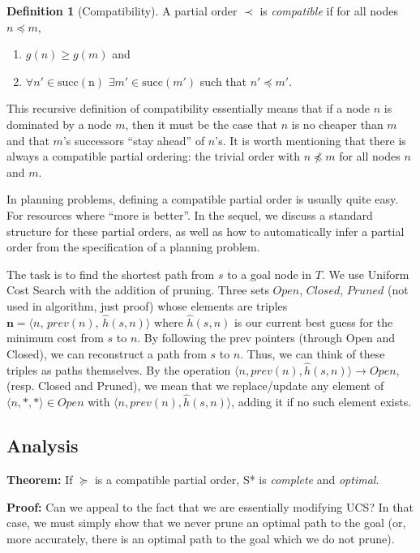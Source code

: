 \documentclass[letterpaper]{article}
\theoremstyle{plain} \newtheorem{theorem}{Theorem} \newtheorem{proposition}{Proposition} \newtheorem{lemma}{Lemma} \newtheorem*{corollary}{Corollary}
\theoremstyle{definition} \newtheorem{definition}{Definition} \newtheorem{conjecture}{Conjecture} \newtheorem*{example}{Example}
\theoremstyle{remark} \newtheorem*{remark}{Remark} \newtheorem*{note}{Note} \newtheorem{case}{Case}
\begin{document}
\begin{definition}[Compatibility]
  A partial order $\prec$ is \textit{compatible} if for all nodes $n \preceq m$,
  \begin{enumerate}
    \item $g(n) \ge g(m)$ and 
    \item $\forall n' \in \mathrm{succ(n)}$ $\exists m' \in \mathrm{succ}(m')$ such that $n' \preceq m'$.
  \end{enumerate}
\end{definition}
This recursive definition of compatibility essentially means that if a node $n$
is dominated by a node $m$, then it must be the case that $n$ is no cheaper than $m$
and that $m$'s successors ``stay ahead'' of $n$'s. It is worth mentioning that
there is always a compatible partial ordering: the trivial order with $n \npreceq m$ for all
nodes $n$ and $m$.

In planning problems, defining a compatible partial order is usually quite easy. For
resources where ``more is better''. In the sequel, we discuss a standard structure
for these partial orders, as well as how to automatically infer a partial order
from the specification of a planning problem.




The task is to find the shortest path from $s$ to a goal node in
$T$. We use Uniform Cost Search with the addition of pruning. Three
sets $Open$, $Closed$, $Pruned$ (not used in algorithm, just proof)
whose elements are triples $\mathbf{n=}\langle n,\, prev(n),\,\hat{h}(s,n)\rangle$
where $\hat{h}(s,n)$ is our current best guess for the minimum cost
from $s$ to $n$. By following the prev pointers (through Open and
Closed), we can reconstruct a path from $s$ to $n$. Thus, we can
think of these triples as paths themselves. By the operation $\langle n,prev(n),\hat{h}(s,n)\rangle\rightarrow Open$,
(resp. Closed and Pruned), we mean that we replace/update any element
of $\langle n,*,*\rangle\in Open$ with $\langle n,prev(n),\hat{h}(s,n)\rangle$,
adding it if no such element exists.

\subsection{Analysis}

\textbf{Theorem:} If $\succeq$ is a compatible partial order, S{*}
is \emph{complete }and \emph{optimal}.

\textbf{Proof:} Can we appeal to the fact that we are essentially
modifying UCS? In that case, we must simply show that we never prune
an optimal path to the goal (or, more accurately, there is an optimal
path to the goal which we do not prune).
\end{document}
